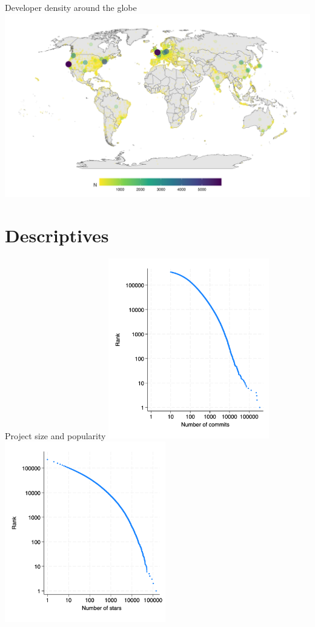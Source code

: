 \documentclass[
  ignorenonframetext,
  aspectratio=1610,
]{beamer}
\begin{document}
\begin{frame}{Developer density around the globe}
\protect\hypertarget{developer-density-around-the-globe}{}
\includegraphics{figures/map_developers.png}
\end{frame}

\section{Descriptives}\label{descriptives}

\begin{frame}{Project size and popularity}
\protect\hypertarget{project-size-and-popularity}{}
\includegraphics[width=7cm,height=\textheight]{figures/commits_rank.png}
\includegraphics[width=7cm,height=\textheight]{figures/stars_rank.png}
\end{frame}
\end{document}
